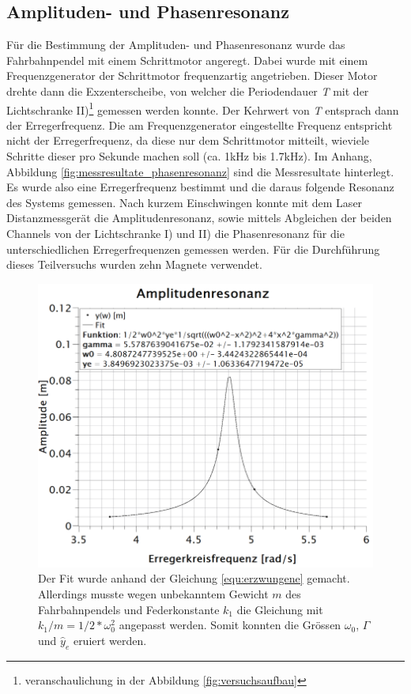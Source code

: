 \subsection{Amplituden- und Phasenresonanz}
Für die Bestimmung der Amplituden- und Phasenresonanz wurde das Fahrbahnpendel mit einem Schrittmotor angeregt. Dabei wurde mit einem Frequenzgenerator der Schrittmotor frequenzartig angetrieben. Dieser Motor drehte dann die Exzenterscheibe, von welcher die Periodendauer \textit{T} mit der Lichtschranke II)\footnote{veranschaulichung in der Abbildung \ref{fig:versuchsaufbau}} gemessen werden konnte. Der Kehrwert von \textit{T} entsprach dann der Erregerfrequenz. Die am Frequenzgenerator eingestellte Frequenz entspricht nicht der Erregerfrequenz, da diese nur dem Schrittmotor mitteilt, wieviele Schritte dieser pro Sekunde machen soll (ca. 1kHz bis 1.7kHz). Im Anhang, Abbildung \ref{fig:messresultate_phasenresonanz} sind die Messresultate hinterlegt.
\\[0.5cm]
Es wurde also eine Erregerfrequenz bestimmt und die daraus folgende Resonanz des Systems gemessen. Nach kurzem Einschwingen konnte mit dem Laser Distanzmessgerät die Amplitudenresonanz, sowie mittels Abgleichen der beiden Channels von der Lichtschranke I) und II) die Phasenresonanz für die unterschiedlichen Erregerfrequenzen gemessen werden. Für die Durchführung dieses Teilversuchs wurden zehn Magnete verwendet.
\begin{figure}[h]
\centering
\includegraphics[scale=1]{Bilder/amplitudenresonanz.png} 
\caption{Der Fit wurde anhand der Gleichung \ref{equ:erzwungene} gemacht. Allerdings musste wegen unbekanntem Gewicht $m$ des Fahrbahnpendels und Federkonstante $k_{1}$ die Gleichung mit $k_{1}/m=1/2*\omega_{0}^{2}$ angepasst werden. Somit konnten die Grössen $\omega_{0}$, $\Gamma$ und $\hat{y}_{e}$ eruiert werden.}
\label{fig:amplitudenresonanz}
\end{figure}
